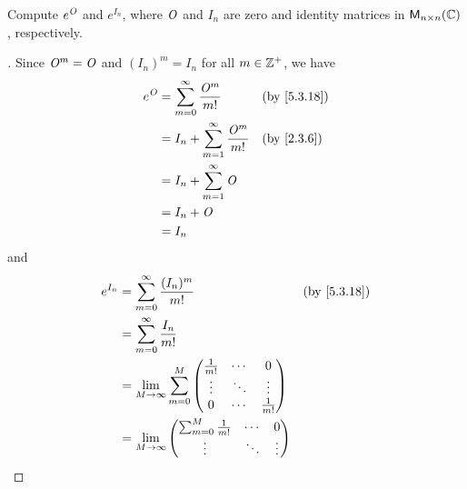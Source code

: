 \begin{ex}\label{ex:5.3.20}
  Compute \(e^{\mathit{O}}\) and \(e^{I_n}\), where \(\mathit{O}\) and \(I_n\) are zero and identity matrices in \(\mathsf{M}_{{n} \times n}({\mathbb{C}})\), respectively.
\end{ex}

\begin{proof}[]
  Since \(\mathit{O}^m = \mathit{O}\) and \((I_n)^m = I_n\) for all \(m \in \mathbb{Z}^+\), we have
  \begin{align*}
    e^{\zm} & = \sum_{m = 0}^\infty \frac{\zm^m}{m!}       &  & \text{(by \cref{5.3.18})} \\
            & = I_n + \sum_{m = 1}^\infty \frac{\zm^m}{m!} &  & \text{(by \cref{2.3.6})}  \\
            & = I_n + \sum_{m = 1}^\infty \zm                                             \\
            & = I_n + \zm                                                                 \\
            & = I_n
  \end{align*}
  and
  \begin{align*}
    e^{I_n} & = \sum_{m = 0}^\infty \frac{(I_n)^m}{m!}                                                                      &  & \text{(by \cref{5.3.18})} \\
            & = \sum_{m = 0}^\infty \frac{I_n}{m!}                                                                                                         \\
            & = \lim_{M \to \infty} \sum_{m = 0}^M \begin{pmatrix}
                                                     \frac{1}{m!} & \cdots & 0            \\
                                                     \vdots       & \ddots & \vdots       \\
                                                     0            & \cdots & \frac{1}{m!}
                                                   \end{pmatrix}                                                                    \\
            & = \lim_{M \to \infty} \begin{pmatrix}
                                      \sum_{m = 0}^M  \frac{1}{m!} & \cdots & 0                           \\
                                      \vdots                       & \ddots & \vdots                      \\

\end{pmatrix}
\end{align*}
\end{proof}
